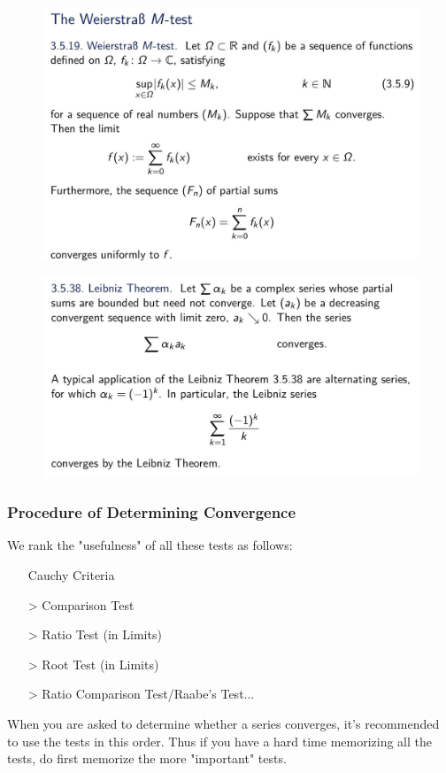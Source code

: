 \documentclass{beamer}
\begin{document}
\begin{frame}
    \begin{figure}[htbp]
        \centering
        \includegraphics[width=12cm]{w.jpg}
    \end{figure}
\end{frame}
\begin{frame}
    \begin{figure}[htbp]
        \centering
        \includegraphics[width=12cm]{l.jpg}
    \end{figure}
\end{frame}
\begin{frame}
    \frametitle{Procedure of Determining Convergence}
    \hspace{1em}We rank the "usefulness" of all these tests as follows:
    \begin{center}
        \begin{itemize}
            \item[] Cauchy Criteria
            \item[>] Comparison Test
            \item[>] Ratio Test (in Limits)
            \item[>] Root Test (in Limits)
            \item[>] Ratio Comparison Test/Raabe’s Test...
        \end{itemize}
    \end{center}
    \par
    \hspace{1em}
    When you are asked to determine whether a series converges, it’s
    recommended to use the tests in this order. Thus if you have a hard time
    memorizing all the tests, do first memorize the more "important" tests.

\end{frame}
\end{document}
